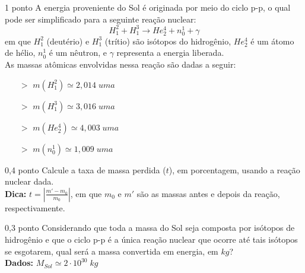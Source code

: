 \documentclass{../lista}
\begin{document}
	\begin{questao}{1 ponto}
		A energia proveniente do Sol é originada por meio do ciclo p-p, o qual pode ser simplificado para a seguinte reação nuclear:
		\begin{equation}
			H_1^2 + H_1^3 \longrightarrow He_2^4 + n_0^1 + \gamma
		\end{equation}
		em que $H_1^2$ (deutério) e $H_1^3$ (trítio) são isótopos do hidrogênio, $He_2^4$ é um átomo de hélio, $n_0^1$ é um nêutron, e $\gamma$ representa a energia liberada. \\
		As massas atômicas envolvidas nessa reação são dadas a seguir:
		\begin{multicols}{2} \begin{itemize}
			\item[$>$] $m(H_1^2) \simeq 2,014 \; uma$
			\item[$>$] $m(H_1^3) \simeq 3,016 \; uma$
			\item[$>$] $m(He_2^4) \simeq 4,003 \; uma$
			\item[$>$] $m(n_0^1) \simeq 1,009 \; uma$
		\end{itemize} \end{multicols}

		\begin{pergunta}{0,4 ponto}
			Calcule a taxa de massa perdida ($t$), em porcentagem, usando a reação nuclear dada. \\
			\textbf{Dica:} $t= \left| \frac{m'-m_0}{m_0} \right|$, em que $m_0$ e $m'$ são as massas antes e depois da reação, respectivamente.
			

		\end{pergunta}

		\begin{pergunta}{0,3 ponto}
			Considerando que toda a massa do Sol seja composta por isótopos de hidrogênio e que o ciclo p-p é a única reação nuclear que ocorre até tais isótopos se esgotarem, qual será a massa convertida em energia, em $kg$? \\
			\textbf{Dados:} $M_{Sol} \simeq 2 \cdot 10^{30} \; kg$
			

\end{pergunta}
\end{questao}
\end{document}
